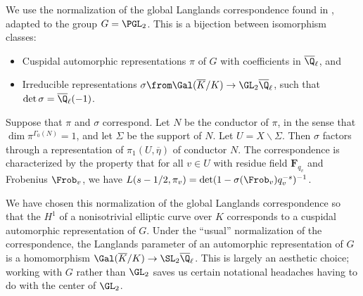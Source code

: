\documentclass{article}
\def\F{\mathbf{F}}
\begin{document}
We use the normalization of the global Langlands correspondence found in \cite{DrinfeldLanglandsConjectureForGL2}, adapted to the group $G=\PGL_2$.  This is a bijection between isomorphism classes:
\begin{itemize}
\item Cuspidal automorphic representations $\pi$ of $G$ with coefficients in $\overline{\Q}_\ell$, and
\item Irreducible representations $\sigma\from \Gal(\overline{K}/K)\to \GL_2\overline{\Q}_\ell$, such that $\det \sigma=\overline{\Q}_\ell(-1)$.  
\end{itemize}
Suppose that $\pi$ and $\sigma$ correspond.   Let $N$ be the conductor of $\pi$, in the sense that $\dim \pi^{\Gamma_0(N)}=1$, and let $\Sigma$ be the support of $N$.   Let $U=X\smallsetminus \Sigma$.  Then $\sigma$ factors through a representation of $\pi_1(U,\overline{\eta})$ of conductor $N$.  The correspondence is characterized by the property that for all $v\in U$ with residue field $\F_{q_v}$ and Frobenius $\Frob_v$, we have $L(s-1/2,\pi_v)=\det(1-\sigma(\Frob_v) q_v^{-s})^{-1}$.  

\begin{rmk} We have chosen this normalization of the global Langlands correspondence so that the $H^1$ of a nonisotrivial elliptic curve over $K$ corresponds to a cuspidal automorphic representation of $G$.  Under the ``usual'' normalization of the correspondence, the Langlands parameter of an automorphic representation of $G$ is a homomorphism $\Gal(\overline{K}/K)\to \SL_2\overline{\Q}_\ell$.  This is largely an aesthetic choice;  working with $G$ rather than $\GL_2$ saves us certain notational headaches having to do with the center of $\GL_2$.  
\end{rmk}
\end{document}
